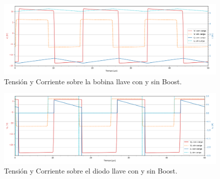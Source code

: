 \begin{multicols}{2}
\begin{figure}[H]
	\centering
	\includegraphics[width=0.9\linewidth]{ImagenesEjercicio-3/il-vl-1v3}
	\caption{Tensión y Corriente sobre la bobina llave con y sin Boost.}
	\label{fig:ej3:Il_Vl_SWITCH_BOOST}
\end{figure}
\begin{figure}[H]
	\centering
	\includegraphics[width=0.9\linewidth]{ImagenesEjercicio-3/id-vd-1v3}
	\caption{Tensión y Corriente sobre el diodo llave con y sin Boost.}
	\label{fig:ej3:Id_Vd_SWITCH_BOOST}
\end{figure}
\end{multicols}

